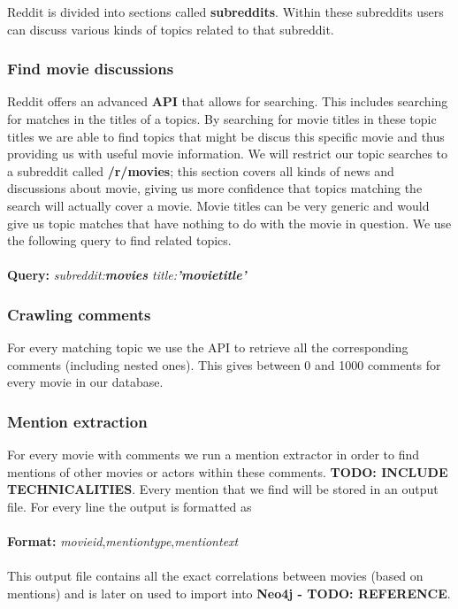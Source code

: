 Reddit is divided into sections called \textbf{subreddits}. 
Within these subreddits users can discuss various kinds of topics related to that subreddit.  

\subsubsection{Find movie discussions}
Reddit offers an advanced \textbf{API} that allows for searching. This includes searching for matches in the titles of a topics. By searching for movie titles in these topic titles we are able to find topics that might be discus this specific movie and thus providing us with useful movie information. We will restrict our topic searches to a subreddit called \textbf{/r/movies}; this section covers all kinds of news and discussions about movie, giving us more confidence that topics matching the search will actually cover a movie. Movie titles can be very generic and would give us topic matches that have nothing to do with the movie in question. We use the following query to find related topics.
\\
\\
\textbf{Query:} \emph{subreddit:\textbf{movies} title:\textbf{'movietitle'}}

\subsubsection{Crawling comments}
For every matching topic we use the API to retrieve all the corresponding comments (including nested ones). This gives between 0 and 1000 comments for every movie in our database.

\subsubsection{Mention extraction}
For every movie with comments we run a mention extractor in order to find mentions of other movies or actors within these comments. \textbf{TODO: INCLUDE TECHNICALITIES}. Every mention that we find will be stored in an output file. For every line the output is formatted as
\\
\\
\textbf{Format:} \textit{movie\textunderscore id},\textit{mention\textunderscore type},\textit{mention\textunderscore text}
\\
\\
This output file contains all the exact correlations between movies (based on mentions) and is later on used to import into \textbf{Neo4j - TODO: REFERENCE}.
